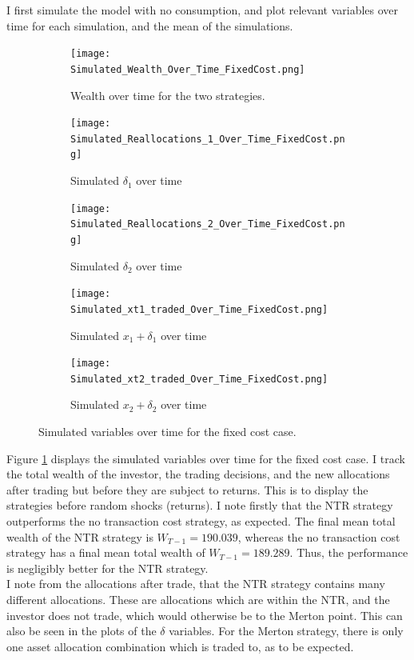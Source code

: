 \documentclass[11pt]{article}
\begin{document}
I first simulate the model with no consumption, and plot relevant variables over time for each simulation, and the mean of the simulations.
\begin{figure}[!ht]
    \centering
    \begin{subfigure}[t]{0.8\textwidth} %
        \centering
        \texttt{[image: Simulated\_Wealth\_Over\_Time\_FixedCost.png]}
        \caption{Wealth over time for the two strategies.}
    \end{subfigure}

    \vspace{1em} %
    \begin{subfigure}[t]{0.49\textwidth}
        \centering
        \texttt{[image: Simulated\_Reallocations\_1\_Over\_Time\_FixedCost.png]}
        \caption{Simulated $\delta_{1}$ over time}
    \end{subfigure}%
    \hfill
    \begin{subfigure}[t]{0.49\textwidth}
        \centering
        \texttt{[image: Simulated\_Reallocations\_2\_Over\_Time\_FixedCost.png]}
        \caption{Simulated $\delta_{2}$ over time}
    \end{subfigure}

    \vspace{1em} %
    \begin{subfigure}[t]{0.49\textwidth}
        \centering
        \texttt{[image: Simulated\_xt1\_traded\_Over\_Time\_FixedCost.png]}
        \caption{Simulated $x_{1} + \delta_{1}$ over time}
    \end{subfigure}%
    \hfill
    \begin{subfigure}[t]{0.49\textwidth}
        \centering
        \texttt{[image: Simulated\_xt2\_traded\_Over\_Time\_FixedCost.png]}
        \caption{Simulated $x_{2} + \delta_{2}$ over time}
    \end{subfigure}
    \caption{Simulated variables over time for the fixed cost case.}
    \label{fig: Simulated_Over_Time_FixedCost}
\end{figure}
Figure \ref{fig: Simulated_Over_Time_FixedCost} displays the simulated variables over time for the fixed cost case.
I track the total wealth of the investor, the trading decisions, and the new allocations after trading but before they are subject to returns.
This is to display the strategies before random shocks (returns).
I note firstly that the NTR strategy outperforms the no transaction cost strategy, as expected.
The final mean total wealth of the NTR strategy is $W_{T-1} = 190.039$, whereas the no transaction cost strategy has a final mean total wealth of $W_{T-1} = 189.289$.
Thus, the performance is negligibly better for the NTR strategy.\\
I note from the allocations after trade, that the NTR strategy contains many different allocations. These are allocations which are within the NTR, and the investor does not trade,
which would otherwise be to the Merton point. This can also be seen in the plots of the $\delta$ variables.
For the Merton strategy, there is only one asset allocation combination which is traded to, as to be expected.
\end{document}
